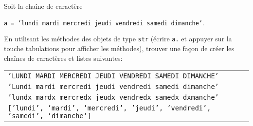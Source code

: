 \begin{exercice}
Soit la chaîne de caractère
\begin{center}
\texttt{a = 'lundi mardi mercredi jeudi vendredi samedi dimanche'}.
\end{center}
En utilisant les méthodes des objets de type \texttt{str} (écrire \texttt{a.} et
appuyer sur la touche tabulations pour afficher les méthodes), trouver une
façon de créer les chaînes de caractères et listes suivantes:
\begin{center}
\begin{tabular}{l}
\texttt{'LUNDI MARDI MERCREDI JEUDI VENDREDI SAMEDI DIMANCHE'}\\
\texttt{'Lundi mardi mercredi jeudi vendredi samedi dimanche'}\\
\texttt{'lundx mardx mercredx jeudx vendredx samedx dxmanche'}\\
\texttt{['lundi', 'mardi', 'mercredi', 'jeudi', 'vendredi', 'samedi', 'dimanche']}
\end{tabular}
\end{center}
\end{exercice}



